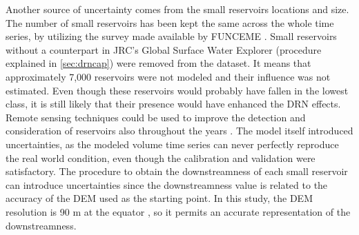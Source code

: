 \documentclass[draft]{agujournal2019}
\begin{document}
Another source of uncertainty comes from the small reservoirs locations and size. The number of small reservoirs has been kept the same across the whole time series, by utilizing the survey made available by FUNCEME \cite{FUNCEME2021}. Small reservoirs without a counterpart in JRC’s Global Surface Water Explorer (procedure explained in \ref{sec:drncap}) were removed from the dataset. It means that approximately 7,000 reservoirs were not modeled and their influence was not estimated. Even though these reservoirs would probably have fallen in the lowest class, it is still likely that their presence would have enhanced the DRN effects. Remote sensing techniques could be used to improve the detection and consideration of reservoirs also throughout the years \cite{RibeiroNeto2022,Pereira2019,Avisse2017,Ogilvie2016}. The model itself introduced uncertainties, as the modeled volume time series can never perfectly reproduce the real world condition, even though the calibration and validation were satisfactory. The procedure to obtain the downstreamness of each small reservoir can introduce uncertainties since the downstreamness value is related to the accuracy of the DEM used as the starting point. In this study, the DEM resolution is 90 m at the equator \cite{CIAT2021}, so it permits an accurate representation of the downstreamness.
\end{document}
